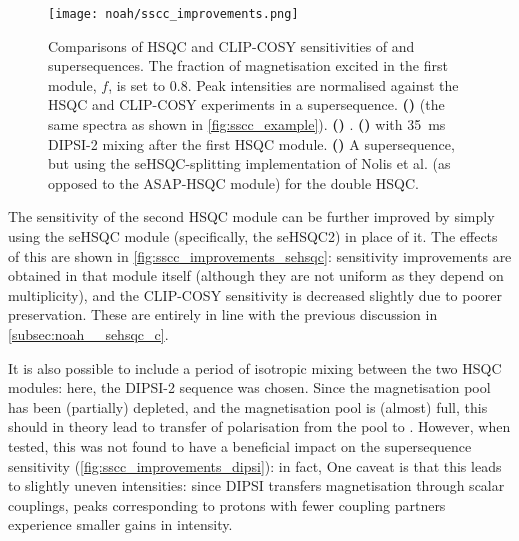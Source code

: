 \begin{figure}[!ht]
    \centering
    \texttt{[image: noah/sscc\_improvements.png]}%
    {\label{fig:sscc_improvements_base}}%
    {\label{fig:sscc_improvements_sehsqc}}%
    {\label{fig:sscc_improvements_dipsi}}%
    {\label{fig:sscc_improvements_mfa}}%
    \caption[Sensitivity comparisons for  and  supersequences]{
        Comparisons of HSQC and CLIP-COSY sensitivities of  and  supersequences.
        The fraction of  magnetisation excited in the first module, $f$, is set to $0.8$.
        Peak intensities are normalised against the HSQC and CLIP-COSY experiments in a  supersequence.
        \textbf{()}  (the same spectra as shown in \cref{fig:sscc_example}).
        \textbf{()} .
        \textbf{()}  with \qty{35}{\ms} DIPSI-2 mixing after the first HSQC module.
        \textbf{()} A  supersequence, but using the seHSQC-splitting implementation of Nolis et al.\autocite{Nolis2019CPC} (as opposed to the ASAP-HSQC module) for the double HSQC.
    }
    \label{fig:sscc_improvements}
\end{figure}

The sensitivity of the second HSQC module can be further improved by simply using the seHSQC module (specifically, the seHSQC2) in place of it.
The effects of this are shown in \cref{fig:sscc_improvements_sehsqc}: sensitivity improvements are obtained in that module itself (although they are not uniform as they depend on multiplicity), and the CLIP-COSY sensitivity is decreased slightly due to poorer  preservation.
These are entirely in line with the previous discussion in \cref{subsec:noah__sehsqc_c}.

It is also possible to include a period of isotropic mixing between the two HSQC modules: here, the DIPSI-2 sequence\autocite{Shaka1988JMR} was chosen.
Since the  magnetisation pool has been (partially) depleted, and the  magnetisation pool is (almost) full, this should in theory lead to transfer of polarisation from the  pool to .
However, when tested, this was not found to have a beneficial impact on the supersequence sensitivity (\cref{fig:sscc_improvements_dipsi}): in fact, 
One caveat is that this leads to slightly uneven intensities: since DIPSI transfers magnetisation through scalar couplings, peaks corresponding to protons with fewer coupling partners experience smaller gains in intensity.

